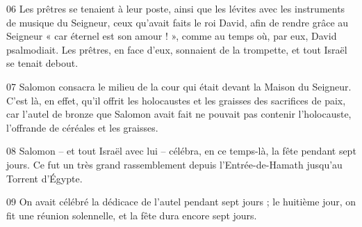 
06 Les prêtres se tenaient à leur poste, ainsi que les lévites avec les instruments de musique du Seigneur, ceux qu’avait faits le roi David, afin de rendre grâce au Seigneur « car éternel est son amour ! », comme au temps où, par eux, David psalmodiait. Les prêtres, en face d’eux, sonnaient de la trompette, et tout Israël se tenait debout.

07 Salomon consacra le milieu de la cour qui était devant la Maison du Seigneur. C’est là, en effet, qu’il offrit les holocaustes et les graisses des sacrifices de paix, car l’autel de bronze que Salomon avait fait ne pouvait pas contenir l’holocauste, l’offrande de céréales et les graisses.

08 Salomon – et tout Israël avec lui – célébra, en ce temps-là, la fête pendant sept jours. Ce fut un très grand rassemblement depuis l’Entrée-de-Hamath jusqu’au Torrent d’Égypte.

09 On avait célébré la dédicace de l’autel pendant sept jours ; le huitième jour, on fit une réunion solennelle, et la fête dura encore sept jours.

